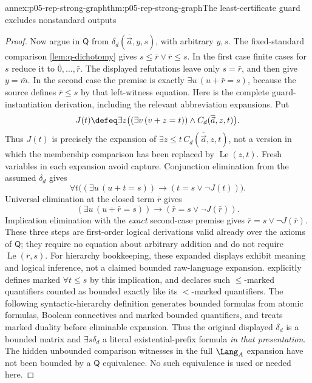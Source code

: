 \begin{annexitem}{annex:p05-rep-strong-graph}{thm:p05-rep-strong-graph}{The least-certificate guard excludes nonstandard outputs}
\begin{proof}
Now argue in \(\mathsf Q\) from
\(\delta_d(\overline{\vec a},y,s)\), with arbitrary \(y,s\).
The fixed-standard comparison \cref{lem:q-dichotomy} gives
\(s\leq\bar r\lor\bar r\leq s\). In the first case finite cases
for \(s\) reduce it to \(\bar0,\ldots,\bar r\). The displayed
refutations leave only \(s=\bar r\), and then give \(y=\bar m\).
In the second case the premise is exactly
\(\exists u\,(u+\bar r=s)\), because the source defines
\(\bar r\leq s\) by that left-witness equation. Here is the complete
guard-instantiation derivation, including the relevant abbreviation
expansions. Put
\[
 J(t)\defeq\exists z\bigl((\exists v\,(v+z=t))\land
                                  C_d(\overline{\vec a},z,t)\bigr).
\]
Thus \(J(t)\) is precisely the expansion of
\(\exists z\leq t\,C_d(\overline{\vec a},z,t)\), not a version in
which the membership comparison has been replaced by
\(\operatorname{Le}(z,t)\). Fresh variables in each expansion avoid
capture. Conjunction elimination from the assumed \(\delta_d\) gives
\[
 \forall t\bigl((\exists u\,(u+t=s))\to(t=s\lor\neg J(t))\bigr).
\]
Universal elimination at the closed term \(\bar r\) gives
\[
 (\exists u\,(u+\bar r=s))\to(\bar r=s\lor\neg J(\bar r)).
\]
Implication elimination with the \emph{exact} second-case premise gives
\(\bar r=s\lor\neg J(\bar r)\). These three steps are first-order
logical derivations valid already over the axioms of \(\mathsf Q\);
they require no equation about arbitrary addition and do not require
\(\operatorname{Le}(\bar r,s)\).
For hierarchy bookkeeping, these expanded displays exhibit meaning and
logical inference, not a claimed bounded raw-language expansion.
 explicitly defines marked
\(\forall t\leq s\) by this implication, and declares such
\(\leq\)-marked quantifiers counted as bounded exactly like its
\(<\)-marked quantifiers. The following syntactic-hierarchy definition
generates bounded formulas from atomic formulas, Boolean connectives and
marked bounded quantifiers, and treats marked duality before eliminable
expansion. Thus the original displayed \(\delta_d\) is a bounded
matrix and \(\exists s\delta_d\) a literal existential-prefix formula
\emph{in that presentation}. The hidden unbounded comparison witnesses
in the full \(\Lang_A\) expansion have not been bounded by a
\(\mathsf Q\) equivalence. No such equivalence is used or needed here.


\end{proof}
\end{annexitem}
